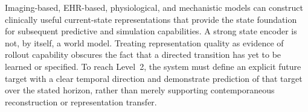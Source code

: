 \levelsummary
{Imaging-based, EHR-based, physiological, and mechanistic models can construct clinically useful current-state representations that provide the state foundation for subsequent predictive and simulation capabilities.}
{A strong state encoder is not, by itself, a world model. Treating representation quality as evidence of rollout capability obscures the fact that a directed transition has yet to be learned or specified.}
{To reach Level~2, the system must define an explicit future target with a clear temporal direction and demonstrate prediction of that target over the stated horizon, rather than merely supporting contemporaneous reconstruction or representation transfer.}




